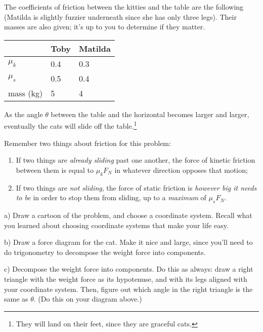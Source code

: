 \documentclass[12pt]{article}
\begin{document}
\begin{minipage}{0.6\textwidth}
	The coefficients of friction between the kitties and the table are the following (Matilda is slightly fuzzier underneath since she has only three legs). Their masses are also
	given; it's up to you to determine if they matter.
\end{minipage}\hspace{0.1\textwidth}
\begin{minipage}{0.3\textwidth}
	\begin{tabular}{|l|l|l|}
		\hline
		& Toby & Matilda \\ \hline
		$\mu_k$ & 0.4  & 0.3  \\ \hline
		$\mu_s$ & 0.5  & 0.4  \\ \hline
		mass (kg) & 5 & 4 \\ \hline
	\end{tabular}
\end{minipage}

As the angle $\theta$ between the table and the horizontal becomes larger and larger, eventually the cats will slide off the 
table.\footnote{They will land on their feet, since they are graceful cats.}

Remember two things about friction for this problem:

\begin{enumerate}
	\item If two things are {\it already sliding} past one another, the force of kinetic friction between them is equal to $\mu_k F_N$ in whatever direction opposes that motion;
	\item If two things are {\it not sliding}, the force of static friction is {\it however big it needs to be} in order to stop
	them from sliding, up to a {\it maximum} of $\mu_s F_N$.
\end{enumerate}

a) Draw a cartoon of the problem, and choose a coordinate system. Recall what you learned about choosing
coordinate systems that make your life easy.
\vfill


\newpage

b) Draw a force diagram for the cat. Make it nice and large, since you'll need to do trigonometry to decompose the 
weight force into components.

\vspace{3in}


c) Decompose the weight force into components. Do this as always: draw a right triangle with the weight force as its 
hypotenuse, and with its legs aligned with your coordinate system. Then, figure out which angle in the right triangle
is the same as $\theta$. (Do this on your diagram above.)
\end{document}
